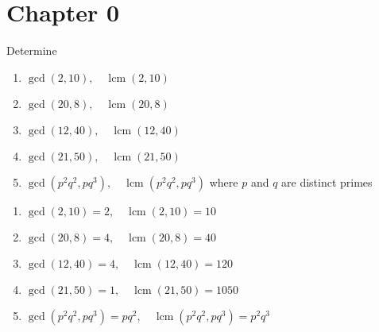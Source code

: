 \section*{Chapter 0}

\begin{hwproblem}{2}{
Determine
\begin{enumerate}[label=\alph*.]
    \item $\operatorname{gcd}(2,10), \quad \operatorname{lcm}(2,10)$
    \item $\operatorname{gcd}(20,8), \quad \operatorname{lcm}(20,8)$
    \item $\operatorname{gcd}(12,40), \quad \operatorname{lcm}(12,40)$
    \item $\operatorname{gcd}(21,50), \quad \operatorname{lcm}(21,50)$
    \item $\operatorname{gcd}\left(p^2 q^2, p q^3\right), \quad \operatorname{lcm}\left(p^2 q^2, p q^3\right)$ where $p$ and $q$ are distinct primes
\end{enumerate}
}

\begin{enumerate}[label=\alph*.]
    \item $\operatorname{gcd}(2,10) = 2, \quad \operatorname{lcm}(2,10) = 10$
    \item $\operatorname{gcd}(20,8) = 4, \quad \operatorname{lcm}(20,8) = 40$
    \item $\operatorname{gcd}(12,40) = 4, \quad \operatorname{lcm}(12,40) = 120$
    \item $\operatorname{gcd}(21,50) = 1, \quad \operatorname{lcm}(21,50) = 1050$
    \item $\operatorname{gcd}\left(p^2 q^2, p q^3\right) = pq^2, \quad \operatorname{lcm}\left(p^2 q^2, p q^3\right) = p^2 q^3$
\end{enumerate}
\end{hwproblem}
